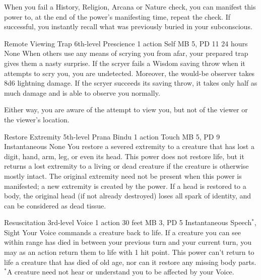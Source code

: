 When you fail a History, Religion, Arcana or Nature check,
you can manifest this power to, at the end of the power's
manifesting time, repeat the check. If successful, you instantly
recall what was previously buried in your subconscious.

\DndPowerHeader%
    {Remote Viewing Trap\label{pwr:remote_viewing_trap}}
    {6th-level Prescience}
    {1 action}
    {Self}
    {MB 5, PD 11}
    {24 hours}
    {None}
When others use any means of scrying you
from afar, your prepared trap gives them a nasty surprise.
If the scryer fails a Wisdom saving throw when it attempts
to scry you, you are undetected. Moreover, the would-be observer
takes 8d6 lightning damage. If the scryer succeeds its saving
throw, it takes only half as much damage and is able to observe
you normally.

Either way, you are aware of the attempt to view you, but
not of the viewer or the viewer's location.

\DndPowerHeader%
    {Restore Extremity\label{pwr:restore_extremity}}
    {5th-level Prana Bindu}
    {1 action}
    {Touch}
    {MB 5, PD 9}
    {Instantaneous}
    {None}
You restore a severed extremity to a creature
that has lost a digit, hand, arm, leg, or even its head. This
power does not restore life, but it returns a lost extremity
to a living or dead creature if the creature is otherwise
mostly intact. The original extremity need not be present
when this power is manifested; a new extremity is created
by the power. If a head is restored to a body, the original
head (if not already destroyed) loses all spark of identity,
and can be considered as dead tissue.

\DndPowerHeader%
    {Resuscitation\label{pwr:resuscitation}}
    {3rd-level Voice}
    {1 action}
    {30 feet}
    {MB 3, PD 5}
    {Instantaneous}
    {Speech$^*$, Sight}
Your Voice commands a creature back to life.
If a creature you can see within range has died in between
your previous turn and your current turn, you may as an action
return them to life with 1 hit point. This power can't return
to life a creature that has died of old age, nor can it restore
any missing body parts.
$^*$A creature need not hear or understand you to be affected
by your Voice.

